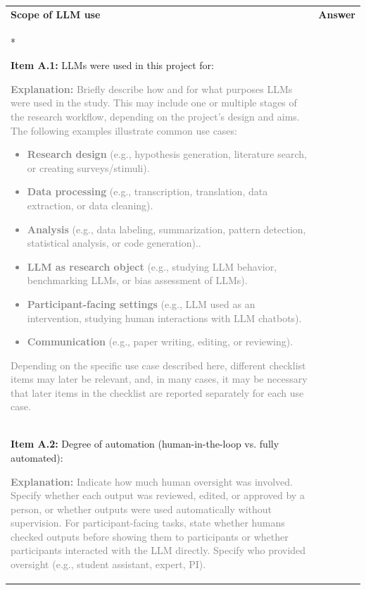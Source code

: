 \documentclass[12pt]{article}
\begin{document}
\begin{longtable}{|p{}|p{}|}
\hline
\rowcolor{green!20}
\textbf{Scope of LLM use} & \textbf{Answer} \\*   %
\hline

\textbf{Item A.1:} LLMs were used in this project for:

\textcolor{gray}{{\footnotesize
\textbf{Explanation:} Briefly describe how and for what purposes LLMs were used in the study. This may include one or multiple stages of the research workflow, depending on the project’s design and aims. The following examples illustrate common use cases:
\begin{itemize}[leftmargin=*]\setlength{\itemsep}{0pt}\setlength{\parskip}{0pt}
    \item \textbf{Research design} (e.g., hypothesis generation, literature search, or creating surveys/stimuli).
    \item \textbf{Data processing} (e.g., transcription, translation, data extraction, or data cleaning).
    \item \textbf{Analysis} (e.g., data labeling, summarization, pattern detection, statistical analysis, or code generation)..
    \item \textbf{LLM as research object} (e.g., studying LLM behavior, benchmarking LLMs, or bias assessment of LLMs).
    \item \textbf{Participant-facing settings} (e.g., LLM used as an intervention, studying human interactions with LLM chatbots).
    \item \textbf{Communication} (e.g., paper writing, editing, or reviewing).
\end{itemize}
Depending on the specific use case described here, different checklist items may later be relevant, and, in many cases, it may be necessary that later items in the checklist are reported separately for each use case.}}
&   \\
\hline
\textbf{Item A.2:} Degree of automation (human-in-the-loop vs. fully automated): 

\textcolor{gray}{{\footnotesize
\textbf{Explanation:} Indicate how much human oversight was involved. Specify whether each output was reviewed, edited, or approved by a person, or whether outputs were used automatically without supervision. For participant-facing tasks, state whether humans checked outputs before showing them to participants or whether participants interacted with the LLM directly. Specify who provided oversight (e.g., student assistant, expert, PI).}}  &   \\
\hline
\end{longtable}
\end{document}
